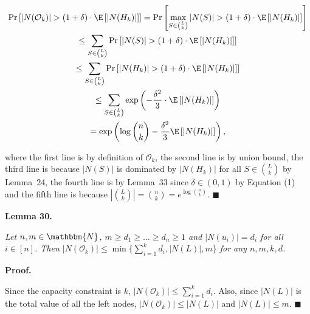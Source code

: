 \documentclass[10pt,a4paper]{article}
\begin{document}
\[\begin{gathered}
\displaystyle\Pr\left[|N(\mathcal{O}_{k})|>(1+\delta)\cdot\E\left[|N(H_{k})|\right]\right] \displaystyle=\Pr\left[\max_{S\in\binom{L}{k}}|N(S)|>(1+\delta)\cdot\E\left[|N(H_{k})|\right]\right] \\
\displaystyle\leq\sum_{S\in\binom{L}{k}}\Pr\left[|N(S)|>(1+\delta)\cdot\E\left[|N(H_{k})|\right]\right] \\
\displaystyle\leq\sum_{S\in\binom{L}{k}}\Pr\left[|N(H_{k})|>(1+\delta)\cdot\E\left[|N(H_{k})|\right]\right] \\
\displaystyle\leq\sum_{S\in\binom{L}{k}}\exp\left(-\frac{\delta^{2}}{3}\cdot\E\left[|N(H_{k})|\right]\right) \\
\displaystyle=\exp\left(\log{\binom{n}{k}}-\frac{\delta^{2}}{3}\E\left[|N(H_{k})|\right]\right),
\end{gathered}\]


where the first line is by definition of $\mathcal{O}_{k}$, the second line is by union bound, the third line is because $|N(S)|$ is dominated by $|N(H_{k})|$ for all $S\in\binom{L}{k}$ by Lemma 24, the fourth line is by Lemma 33 since $\delta\in(0,1)$ by Equation (1) and the fifth line is because $|\binom{L}{k}|=\binom{n}{k}=e^{\log{\binom{n}{k}}}$.
\ensuremath{\blacksquare}\par






\par\medskip\noindent\textbf{\textbf{Lemma 30}\textbf{.}}\par



\emph{Let $n,m\in\mathbbm{N}$, $m\geq d_{1}\geq\dots\geq d_{n}\geq 1$ and $|N(u_{i})|=d_{i}$ for all $i\in[n]$. Then $|N(\mathcal{O}_{k})|\leq\min\{\sum_{i=1}^{k}{d_{i}},|N(L)|,m\}$ for any $n,m,k,d$.}\par






\par\medskip\noindent\textbf{Proof.}\par



Since the capacity constraint is $k$, $|N(\mathcal{O}_{k})|\leq\sum_{i=1}^{k}d_{i}$.
Also, since $|N(L)|$ is the total value of all the left nodes, $|N(\mathcal{O}_{k})|\leq|N(L)|$ and $|N(L)|\leq m$.
\ensuremath{\blacksquare}\par
\end{document}
